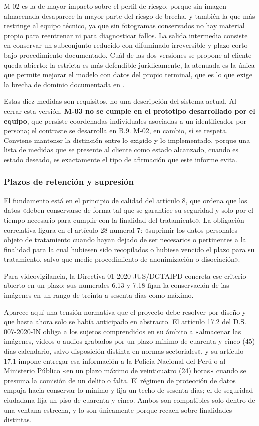 M-02 es la de mayor impacto sobre el perfil de riesgo, porque sin imagen
almacenada desaparece la mayor parte del riesgo de brecha, y también la
que más restringe al equipo técnico, ya que sin fotogramas conservados
no hay material propio para reentrenar ni para diagnosticar fallos. La
salida intermedia consiste en conservar un subconjunto reducido con
difuminado irreversible y plazo corto bajo procedimiento documentado.
Cuál de las dos versiones se propone al cliente queda abierto: la
estricta es más defendible jurídicamente, la atenuada es la única que
permite mejorar el modelo con datos del propio terminal, que es lo que
exige la brecha de dominio documentada en \cite{Lin_2025_CVPR}.

Estas diez medidas son requisitos, no una descripción del sistema
actual. Al cerrar esta versión, \textbf{M-03 no se cumple en el
prototipo desarrollado por el equipo}, que persiste coordenadas
individuales asociadas a un identificador por persona; el contraste se
desarrolla en B.9. M-02, en cambio, sí se respeta. Conviene mantener la
distinción entre lo exigido y lo implementado, porque una lista de
medidas que se presente al cliente como estado alcanzado, cuando es
estado deseado, es exactamente el tipo de afirmación que este informe
evita.

\subsubsection{Plazos de retención y supresión}

El fundamento está en el principio de calidad del artículo 8, que ordena
que los datos «deben conservarse de forma tal que se garantice su
seguridad y solo por el tiempo necesario para cumplir con la finalidad
del tratamiento». La obligación correlativa figura en el artículo 28
numeral 7: «suprimir los datos personales objeto de tratamiento cuando
hayan dejado de ser necesarios o pertinentes a la finalidad para la cual
hubiesen sido recopilados o hubiese vencido el plazo para su
tratamiento, salvo que medie procedimiento de anonimización o
disociación».

Para videovigilancia, la Directiva 01-2020-JUS/DGTAIPD concreta ese
criterio abierto en un plazo: sus numerales 6.13 y 7.18 fijan la
conservación de las imágenes en un rango de treinta a sesenta días como
máximo.

Aparece aquí una tensión normativa que el proyecto debe resolver por
diseño y que hasta ahora solo se había anticipado en abstracto. El
artículo 17.2 del D.S. 007-2020-IN obliga a los sujetos comprendidos en
su ámbito a «almacenar las imágenes, videos o audios grabados por un
plazo mínimo de cuarenta y cinco (45) días calendario, salvo disposición
distinta en normas sectoriales», y su artículo 17.1 impone entregar esa
información a la Policía Nacional del Perú o al Ministerio Público «en
un plazo máximo de veinticuatro (24) horas» cuando se presuma la
comisión de un delito o falta. El régimen de protección de datos empuja
hacia conservar lo mínimo y fija un techo de sesenta días; el de
seguridad ciudadana fija un piso de cuarenta y cinco. Ambos son
compatibles solo dentro de una ventana estrecha, y lo son únicamente
porque recaen sobre finalidades distintas.

